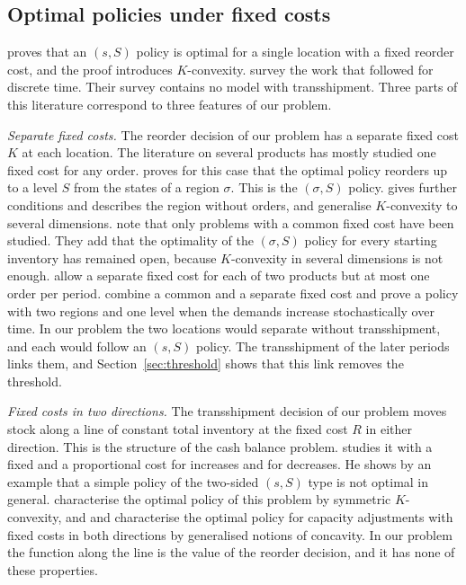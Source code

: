 \documentclass[11pt]{article}
\theoremstyle{definition}
\begin{document}
\subsection{Optimal policies under fixed costs}

\citet{scarf1959optimality} proves that an $(s,S)$ policy is optimal for a single location with a fixed reorder cost, and the proof introduces $K$-convexity. \citet{perera2023survey} survey the work that followed for discrete time. Their survey contains no model with transshipment. Three parts of this literature correspond to three features of our problem.

\emph{Separate fixed costs.} The reorder decision of our problem has a separate fixed cost $K$ at each location. The literature on several products has mostly studied one fixed cost for any order. \citet{johnson1967optimality} proves for this case that the optimal policy reorders up to a level $S$ from the states of a region $\sigma$. This is the $(\sigma,S)$ policy. \citet{kalin1980optimality} gives further conditions and describes the region without orders, and \citet{gallego2005k} generalise $K$-convexity to several dimensions. \citet{perera2023survey} note that only problems with a common fixed cost have been studied. They add that the optimality of the $(\sigma,S)$ policy for every starting inventory has remained open, because $K$-convexity in several dimensions is not enough. \citet{firouzi2014two} allow a separate fixed cost for each of two products but at most one order per period. \citet{kong2024dynamic} combine a common and a separate fixed cost and prove a policy with two regions and one level when the demands increase stochastically over time. In our problem the two locations would separate without transshipment, and each would follow an $(s,S)$ policy. The transshipment of the later periods links them, and Section~\ref{sec:threshold} shows that this link removes the threshold.

\emph{Fixed costs in two directions.} The transshipment decision of our problem moves stock along a line of constant total inventory at the fixed cost $R$ in either direction. This is the structure of the cash balance problem. \citet{neave1970stochastic} studies it with a fixed and a proportional cost for increases and for decreases. He shows by an example that a simple policy of the two-sided $(s,S)$ type is not optimal in general. \citet{chen2009new} characterise the optimal policy of this problem by symmetric $K$-convexity, and \citet{ye2007optimal} and \citet{semple2007note} characterise the optimal policy for capacity adjustments with fixed costs in both directions by generalised notions of concavity. In our problem the function along the line is the value of the reorder decision, and it has none of these properties.
\end{document}
